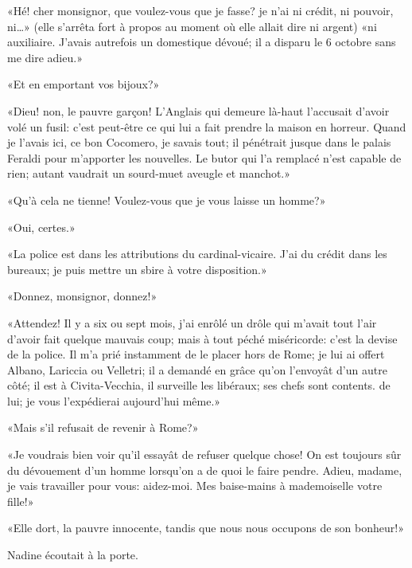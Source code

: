 «Hé! cher monsignor, que voulez-vous que je fasse? je n'ai ni crédit, ni pouvoir, ni\ldots{}» (elle s'arrêta fort à propos au moment où elle allait dire ni argent) «ni auxiliaire. J'avais autrefois un domestique dévoué; il a disparu le 6 octobre sans me dire adieu.»

«Et en emportant vos bijoux?»

«Dieu! non, le pauvre garçon! L'Anglais qui demeure là-haut l'accusait d'avoir volé un fusil: c'est peut-être ce qui lui a fait prendre la maison en horreur. Quand je l'avais ici, ce bon Cocomero, je savais tout; il pénétrait jusque dans le palais Feraldi pour m'apporter les nouvelles. Le butor qui l'a remplacé n'est capable de rien; autant vaudrait un sourd-muet aveugle et manchot.»

«Qu'à cela ne tienne! Voulez-vous que je vous laisse un homme?»

«Oui, certes.»

«La police est dans les attributions du cardinal-vicaire. J'ai du crédit dans les bureaux; je puis mettre un sbire à votre disposition.»

«Donnez, monsignor, donnez!»

«Attendez! Il y a six ou sept mois, j'ai enrôlé un drôle qui m'avait tout l'air d'avoir fait quelque mauvais coup; mais à tout péché miséricorde: c'est la devise de la police. Il m'a prié instamment de le placer hors de Rome; je lui ai offert Albano, Lariccia ou Velletri; il a demandé en grâce qu'on l'envoyât d'un autre côté; il est à Civita-Vecchia, il surveille les libéraux; ses chefs sont contents. de lui; je vous l'expédierai aujourd'hui même.»

«Mais s'il refusait de revenir à Rome?»

«Je voudrais bien voir qu'il essayât de refuser quelque chose! On est toujours sûr du dévouement d'un homme lorsqu'on a de quoi le faire pendre. Adieu, madame, je vais travailler pour vous: aidez-moi. Mes baise-mains à mademoiselle votre fille!»

«Elle dort, la pauvre innocente, tandis que nous nous occupons de son bonheur!»

Nadine écoutait à la porte.
